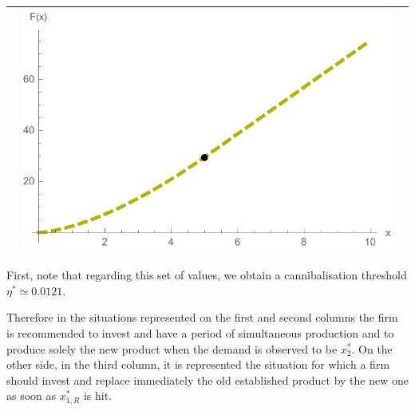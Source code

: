 \begin{table}[!htb]
\begin{tabular}{c|c|c}
\begin{minipage}{.4\textwidth}
		\end{minipage}
		& \begin{minipage}{.4\textwidth}
			\includegraphics[width=\linewidth]{Prob3/eta013dash.pdf}
		\end{minipage} \\ \hline
	\end{tabular}
	\label{fig:3_F}
\end{table}


First, note that regarding this set of values, we obtain a cannibalisation threshold $\eta^*\simeq 0.0121$. 

Therefore in the situations represented on the first and second columns the firm is recommended to 
invest and have a period of simultaneous production and to produce solely the new product when the demand is observed to be $x^*_2$.
On the other side, in the third column, it is represented the situation for which a firm should invest and replace immediately the old established product by the new one as soon as $x^*_{1,R}$ is hit.

